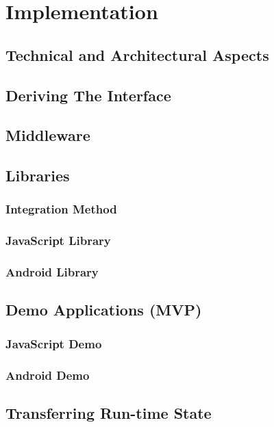 \chapter{Implementation}
\label{ch:implementation}


\section{Technical and Architectural Aspects}
\section{Deriving The Interface}
\section{Middleware}
\section{Libraries}
\subsection{Integration Method}
\subsection{JavaScript Library}
\subsection{Android Library}
\section{Demo Applications (MVP)}
\subsection{JavaScript Demo}
\subsection{Android Demo}
\section{Transferring Run-time State}

